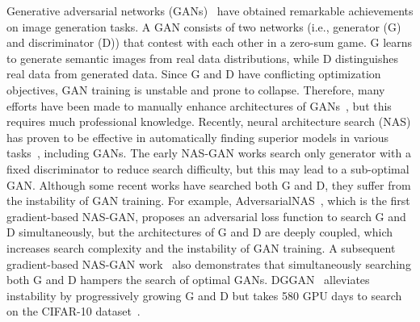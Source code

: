 \documentclass[runningheads]{llncs}
\begin{document}
Generative adversarial networks (GANs)~\cite{goodfellow2014generative} have obtained remarkable achievements on image generation tasks. A GAN consists of two networks (i.e., generator (G) and discriminator (D)) that contest with each other in a zero-sum game. G learns to generate semantic images from real data distributions, while D distinguishes real data from generated data. Since G and D have conflicting optimization objectives, GAN training is unstable and prone to collapse. Therefore, many efforts have been made to manually enhance architectures of GANs~\cite{dcgan,biggan}, but this requires much professional knowledge. Recently, neural architecture search (NAS) has proven to be effective in automatically finding superior models in various tasks~\cite{nas_survey,automl_he}, including GANs. The early NAS-GAN works \cite{autoGAN,agan} search only generator with a fixed discriminator to reduce search difficulty, but this may lead to a sub-optimal GAN. Although some recent works have searched both G and D, they suffer from the instability of GAN training. For example, AdversarialNAS~\cite{Adversarialnas}, which is the first gradient-based NAS-GAN, proposes an adversarial loss function to search G and D simultaneously, but the architectures of G and D are deeply coupled, which increases search complexity and the instability of GAN training. A subsequent gradient-based NAS-GAN work~\cite{AlphaGAN} also demonstrates that simultaneously searching both G and D hampers the search of optimal GANs. DGGAN~\cite{dggan} alleviates instability by progressively growing G and D but takes 580 GPU days to search on the CIFAR-10 dataset~\cite{cifar10}.
\end{document}
